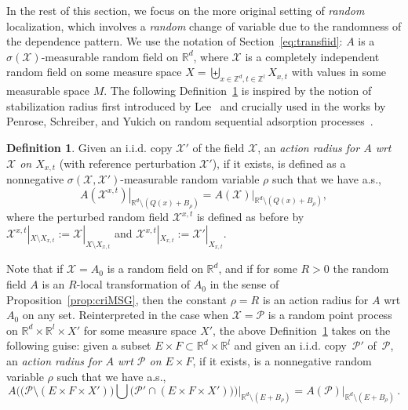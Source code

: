 \documentclass[11pt]{article}
\theoremstyle{definition}
\newtheorem{defi}[theo]{Definition}
\numberwithin{equation}{section}
\numberwithin{figure}{section}
\numberwithin{table}{section}
\newcommand{\R}{\mathbb R}
\newcommand{\Z}{\mathbb Z}
\newcommand{\X}{\mathcal X}
\newcommand{\Pc}{\mathcal P}
\begin{document}
In the rest of this section, we focus on the more original setting of \emph{random} localization, which involves a \emph{random} change of variable due to the randomness of the dependence pattern. We use the notation of Section~\ref{eq:transfiid}: $A$ is a $\sigma(\X)$-measurable random field on $\R^d$, where $\X$ is a completely independent random field on some measure space $X=\biguplus_{x\in\Z^d,t\in\Z^l}X_{x,t}$ with values in some measurable space $M$. The following Definition~\ref{def:ar} is inspired by the notion of stabilization radius first introduced by Lee~\cite{Lee-97,Lee-99} and crucially used in the works by Penrose, Schreiber, and Yukich on random sequential adsorption processes~\cite{Penrose-05,Penrose-Yukich-02,PY-05,Schreiber-Penrose-Yukich-07}.
\begin{defi}\label{def:ar}
Given an i.i.d. copy $\X'$ of the field $\X$, an \emph{ action radius for $A$ wrt $\X$ on $X_{x,t}$} (with reference perturbation $\X'$), if it exists, is defined as a nonnegative $\sigma(\X,\X')$-measurable random variable $\rho$ such that we have a.s.,
\[
\left.A(\X^{x,t})\right|_{\R^d\setminus (Q(x)+B_\rho)}=\left.A(\X)\right|_{\R^d\setminus(Q(x)+B_\rho)},
\]
where the perturbed random field $\X^{x,t}$ is defined as before by $\X^{x,t}|_{X\setminus X_{x,t}}:=\X|_{X\setminus X_{x,t}}$ and $\X^{x,t}|_{X_{x,t}}:=\X'|_{X_{x,t}}$.
\end{defi}
Note that if $\X=A_0$ is a random field on $\R^d$, and if for some $R>0$ the random field $A$ is an $R$-local transformation of $A_0$ in the sense of Proposition~\ref{prop:criMSG}, then the constant $\rho=R$ is an action radius for $A$ wrt $A_0$ on any set. Reinterpreted in the case when $\X=\Pc$ is a random point process on $\R^d\times\R^{l}\times X'$ for some measure space $X'$, the above Definition~\ref{def:ar} takes on the following guise: given a subset $E\times F\subset \R^d\times \R^{l}$ and given an i.i.d. copy~$\Pc'$ of~$\Pc$, an \emph{action radius for $A$ wrt $\Pc$ on $E\times F$}, if it exists, is a nonnegative random variable $\rho$ such that we have a.s.,
\[
A\Big(\big(\Pc\setminus (E\times F\times X')\big)\bigcup \big(\Pc'\cap (E\times F\times X')\big)\Big)\Big|_{\R^d\setminus (E+B_\rho)}=A(\Pc)\big|_{\R^d\setminus (E+B_\rho)}\,.
\]
\end{document}
